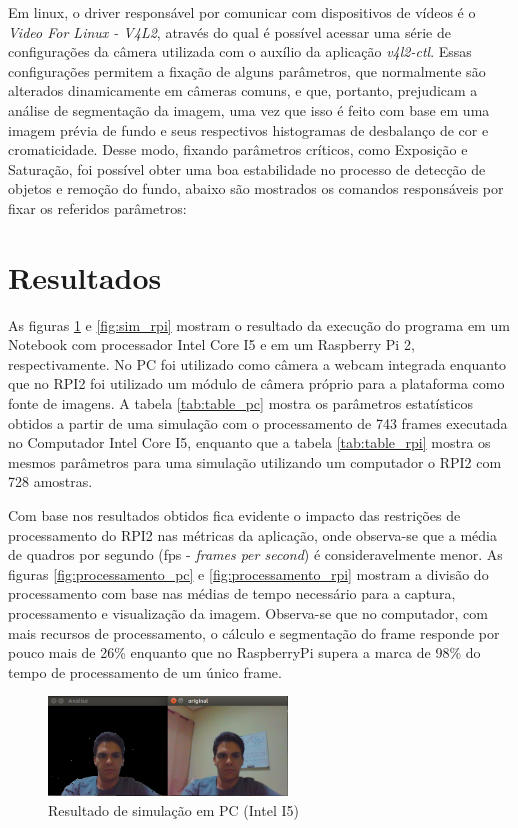 \documentclass[conference]{IEEEtran}
\begin{document}
Em linux, o driver responsável por comunicar com dispositivos de vídeos é o \textit{Video For Linux - V4L2}, através do qual é possível acessar uma série de configurações da câmera utilizada com o auxílio da aplicação \textit{v4l2-ctl}. Essas configurações permitem a fixação de alguns parâmetros, que normalmente são alterados dinamicamente em câmeras comuns, e que, portanto, prejudicam a análise de segmentação da imagem, uma vez que isso é feito com base em uma imagem prévia de fundo e seus respectivos histogramas de desbalanço de cor e cromaticidade. Desse modo, fixando parâmetros críticos, como Exposição e Saturação, foi possível obter uma boa estabilidade no processo de detecção de objetos e remoção do fundo, abaixo são mostrados os comandos responsáveis por fixar os referidos parâmetros:



\section{Resultados}
As figuras \ref{fig:sim_pc} e \ref{fig:sim_rpi} mostram o resultado da execução do programa em um Notebook com processador Intel Core I5 e em um Raspberry Pi 2, respectivamente. No PC foi utilizado como câmera a webcam integrada enquanto que no RPI2 foi utilizado um módulo de câmera próprio para a plataforma como fonte de imagens. A tabela \ref{tab:table_pc} mostra os parâmetros estatísticos obtidos a partir de uma simulação com o processamento de 743 frames executada no Computador Intel Core I5, enquanto que  a tabela \ref{tab:table_rpi} mostra os mesmos parâmetros para uma simulação utilizando um computador o RPI2 com 728 amostras.

Com base nos resultados obtidos fica evidente o impacto das restrições de processamento do RPI2 nas métricas da aplicação, onde observa-se que a média de quadros por segundo (fps - \textit{frames per second}) é consideravelmente menor. As figuras \ref{fig:processamento_pc} e \ref{fig:processamento_rpi} mostram a divisão do processamento com base nas médias de tempo necessário para a captura, processamento e visualização da imagem. Observa-se que no computador, com mais recursos de processamento, o cálculo e segmentação do frame responde por pouco mais de 26\% enquanto que no RaspberryPi supera a marca de 98\% do tempo de processamento de um único frame.

\begin{figure}[!t]
\centering
\includegraphics[width=2.5in]{Screen_PC_01}
\caption{Resultado de simulação em PC (Intel I5)}
\label{fig:sim_pc}
\end{figure}
\end{document}
